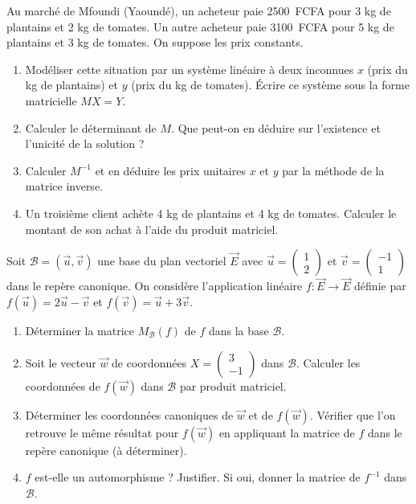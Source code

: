 \documentclass[11pt]{article}
\begin{document}
\begin{exercice}
Au marché de Mfoundi (Yaoundé), un acheteur paie \SI{2500}{FCFA} pour 3 kg de plantains et 2 kg de tomates. Un autre acheteur paie \SI{3100}{FCFA} pour 5 kg de plantains et 3 kg de tomates. On suppose les prix constants.
\begin{enumerate}
    \item Modéliser cette situation par un système linéaire à deux inconnues $x$ (prix du kg de plantains) et $y$ (prix du kg de tomates). Écrire ce système sous la forme matricielle $M X = Y$.
    \item Calculer le déterminant de $M$. Que peut-on en déduire sur l'existence et l'unicité de la solution ?
    \item Calculer $M^{-1}$ et en déduire les prix unitaires $x$ et $y$ par la méthode de la matrice inverse.
    \item Un troisième client achète 4 kg de plantains et 4 kg de tomates. Calculer le montant de son achat à l'aide du produit matriciel.
\end{enumerate}
\end{exercice}

\begin{exercice}
Soit $\mathcal{B} = (\vec{u}, \vec{v})$ une base du plan vectoriel $\overrightarrow{E}$ avec $\vec{u} = \begin{pmatrix} 1 \\ 2 \end{pmatrix}$ et $\vec{v} = \begin{pmatrix} -1 \\ 1 \end{pmatrix}$ dans le repère canonique.
On considère l'application linéaire $f : \overrightarrow{E} \to \overrightarrow{E}$ définie par $f(\vec{u}) = 2\vec{u} - \vec{v}$ et $f(\vec{v}) = \vec{u} + 3\vec{v}$.
\begin{enumerate}
    \item Déterminer la matrice $M_{\mathcal{B}}(f)$ de $f$ dans la base $\mathcal{B}$.
    \item Soit le vecteur $\vec{w}$ de coordonnées $X = \begin{pmatrix} 3 \\ -1 \end{pmatrix}$ dans $\mathcal{B}$. Calculer les coordonnées de $f(\vec{w})$ dans $\mathcal{B}$ par produit matriciel.
    \item Déterminer les coordonnées canoniques de $\vec{w}$ et de $f(\vec{w})$. Vérifier que l'on retrouve le même résultat pour $f(\vec{w})$ en appliquant la matrice de $f$ dans le repère canonique (à déterminer).
    \item $f$ est-elle un automorphisme ? Justifier. Si oui, donner la matrice de $f^{-1}$ dans $\mathcal{B}$.
\end{enumerate}
\end{exercice}
\end{document}
